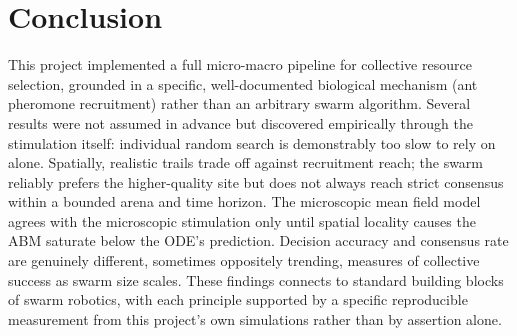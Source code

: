 \documentclass{article}
\begin{document}
\section{Conclusion}
This project implemented a full micro-macro pipeline for collective resource selection, grounded in a specific, well-documented biological mechanism (ant pheromone recruitment) rather than an arbitrary swarm algorithm. Several results were not assumed in advance but discovered empirically through the stimulation itself: individual random search is demonstrably too slow to rely on alone. Spatially, realistic trails trade off against recruitment reach; the swarm reliably prefers the higher-quality site but does not always reach strict consensus within a bounded arena and time horizon. The microscopic mean field model agrees with the microscopic stimulation only until spatial locality causes the ABM saturate below the ODE's prediction. Decision accuracy and consensus rate are genuinely different, sometimes oppositely trending, measures of collective success as swarm size scales. These findings connects to standard building blocks of swarm robotics, with each principle supported by a specific reproducible measurement from this project's own simulations rather than by assertion alone.
\end{document}
